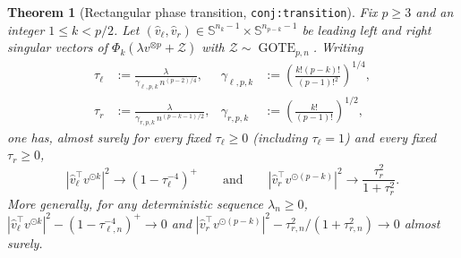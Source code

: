 \documentclass[11pt]{article}
\theoremstyle{plain}
\newtheorem{theorem}{Theorem}
\theoremstyle{definition}
\theoremstyle{remark}
\DeclareMathOperator{\GOTE}{GOTE}
\begin{document}
\begin{theorem}[Rectangular phase transition, \texttt{conj:transition}]\label{thm:rect}
Fix $p \ge 3$ and an integer $1 \le k < p/2$. Let $(\hat v_\ell, \hat v_r) \in \mathbb{S}^{n_k-1} \times \mathbb{S}^{n_{p-k}-1}$ be leading left and right singular vectors of $\Phi_k(\lambda v^{\otimes p} + \mathcal{Z})$ with $\mathcal{Z} \sim \GOTE_{p,n}$. Writing
\begin{align*}
\tau_\ell &:= \frac{\lambda}{\gamma_{\ell,p,k}\, n^{(p-2)/4}}, &
\gamma_{\ell,p,k} &:= \left(\frac{k!(p-k)!}{(p-1)!^2}\right)^{1/4},\\
\tau_r &:= \frac{\lambda}{\gamma_{r,p,k}\, n^{(p-k-1)/2}}, &
\gamma_{r,p,k} &:= \left(\frac{k!}{(p-1)!}\right)^{1/2},
\end{align*}
one has, almost surely for every fixed $\tau_\ell \ge 0$ (including $\tau_\ell = 1$) and every fixed $\tau_r \ge 0$,
\begin{equation}\label{eq:rect-limits}
|\hat v_\ell^\top v^{\odot k}|^2 \longrightarrow (1 - \tau_\ell^{-4})^+
\qquad \text{and} \qquad
|\hat v_r^\top v^{\odot(p-k)}|^2 \longrightarrow \frac{\tau_r^2}{1 + \tau_r^2}.
\end{equation}
More generally, for any deterministic sequence $\lambda_n \ge 0$, $|\hat v_\ell^\top v^{\odot k}|^2 - (1 - \tau_{\ell,n}^{-4})^+ \to 0$ and $|\hat v_r^\top v^{\odot(p-k)}|^2 - \tau_{r,n}^2/(1 + \tau_{r,n}^2) \to 0$ almost surely.
\end{theorem}
\end{document}
